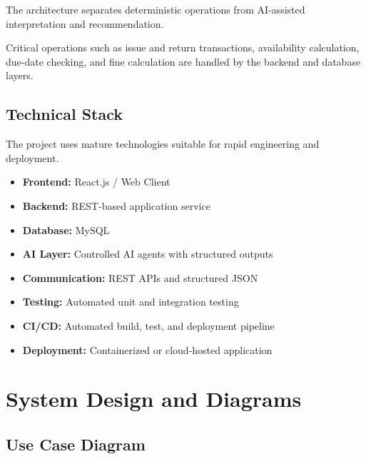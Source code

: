 \documentclass{tietreport}
\begin{document}
The architecture separates deterministic operations from AI-assisted
interpretation and recommendation.

Critical operations such as issue and return transactions, availability
calculation, due-date checking, and fine calculation are handled by the
backend and database layers.

\subsection{Technical Stack}

The project uses mature technologies suitable for rapid engineering and
deployment.

\begin{itemize}

    \item \textbf{Frontend:} React.js / Web Client

    \item \textbf{Backend:} REST-based application service

    \item \textbf{Database:} MySQL

    \item \textbf{AI Layer:} Controlled AI agents with structured outputs

    \item \textbf{Communication:} REST APIs and structured JSON

    \item \textbf{Testing:} Automated unit and integration testing

    \item \textbf{CI/CD:} Automated build, test, and deployment pipeline

    \item \textbf{Deployment:} Containerized or cloud-hosted application

\end{itemize}


\section{System Design and Diagrams}

\subsection{Use Case Diagram}
\end{document}
